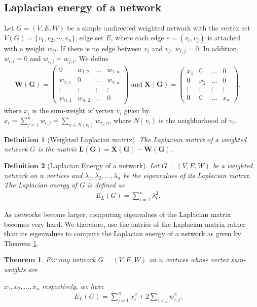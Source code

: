 \documentclass[10pt,a4paper]{article}
\newtheorem{thm}{Theorem}
\newtheorem{defn}{Definition}
\begin{document}
\subsection{Laplacian energy of a network}
Let $G = (V,E,W)$ be a simple undirected weighted network with the vertex set $V(G) = \{v_1,v_2,\cdots, v_n\}$, edge set $E$, where each edge $e=(v_i,v_j)$ is attached with a weight $w_{ij}$. If there is no edge between $v_i$ and $v_j$, $w_{i,j}=0$. In addition, $w_{i,i} =0$ and $w_{i,j} = w_{j,i}$. We define 
\begin{eqnarray*}
	\mathbf{W(G)} = \begin{pmatrix}
		0 & w_{1,2} & \ldots  & w_{1,n} \\
		w_{2,1} & 0 & \ldots & w_{2,n} \\
		\vdots   & \vdots & \vdots & \vdots \\
		w_{n,1} & w_{n,2} & \ldots & 0 
	\end{pmatrix} \text{ and }
	\mathbf{X(G)} = \begin{pmatrix}
		x_1 & 0 & \ldots  & 0 \\
		0 & x_2 & \ldots & 0 \\
		\vdots   &\vdots & \vdots & \vdots \\
		0 & 0 & \ldots & x_n
	\end{pmatrix} ,
\end{eqnarray*}
where $x_i$ is the sum-weight of vertex $v_i$ given by $x_i = \sum_{j=1}^n w_{i,j} = \sum_{u \in N(v_i)} w_{v_i,u}$, where $N(v_i)$ is the neighborhood of $v_i$.
\begin{defn}[Weighted Laplacian matrix]
	The Laplacian matrix of a weighted network $G$ is the matrix $\mathbf{L(G)} = \mathbf{X(G)} - \mathbf{W(G)}$. 
\end{defn}
\begin{defn}[Laplacian Energy of a network]
	Let $G=(V,E,W)$ be a weighted network on $n$ vertices and $\lambda_1,\lambda_2, \ldots,\lambda_n$ be the eigenvalues of its Laplacian matrix. The Laplacian energy of $G$ is defined as 
	\begin{eqnarray*}
		E_L(G) = \sum_{i=1}^n \lambda_i ^2 .
	\end{eqnarray*} 
\end{defn}
As networks become larger, computing eigenvalues of the Laplacian matrix becomes very hard. We therefore, use the entries of the Laplacian matrix rather than its eigenvalues to compute the Laplacian energy of a network as given by Theorem \ref{theorem:1}.
\begin{thm}
	For any network $G=(V,E,W)$ on $n$ vertices whose vertex sum-weights are  
	
	$x_1,x_2, \ldots, x_n$ respectively, we have
	\begin{eqnarray}
	E_L(G) = \sum_{i=1}^n x_i^2 + 2 \sum_{i<j} w_{i,j}^2.
	\end{eqnarray}
	\label{theorem:1}
\end{thm}
\end{document}
